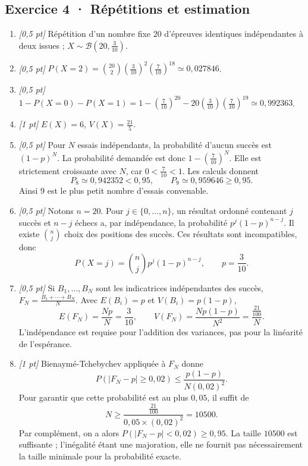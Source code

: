 \subsection*{Exercice 4 · Répétitions et estimation}\begin{enumerate}

\item \textit{[0,5 pt]} Répétition d'un nombre fixe $20$ d'épreuves identiques indépendantes à deux issues ; $X\sim\mathcal B(20,\frac{3}{10})$.

\item \textit{[0,5 pt]} $P(X=2)=\binom{20}2(\frac{3}{10})^2(\frac{7}{10})^{18}\simeq0{,}027846$.

\item \textit{[0,5 pt]} $1-P(X=0)-P(X=1)=1-(\frac{7}{10})^{20}-20(\frac{3}{10})(\frac{7}{10})^{19}\simeq0{,}992363$.

\item \textit{[1 pt]} $E(X)=6$, $V(X)=\frac{21}{5}$.

\item \textit{[0,5 pt]} Pour $N$ essais indépendants, la probabilité d'aucun succès est $(1-p)^N$. La probabilité demandée est donc $1-(\frac{7}{10})^N$. Elle est strictement croissante avec $N$, car $0<\frac{7}{10}<1$. Les calculs donnent
\[P_{8}\simeq0{,}942352<0{,}95,\qquad P_{9}\simeq0{,}959646\ge0{,}95.\]
Ainsi $9$ est le plus petit nombre d'essais convenable.

\item \textit{[0,5 pt]} Notons $n=20$. Pour $j\in\{0,\ldots,n\}$, un résultat ordonné contenant $j$ succès et $n-j$ échecs a, par indépendance, la probabilité $p^j(1-p)^{n-j}$. Il existe $\binom nj$ choix des positions des succès. Ces résultats sont incompatibles, donc
\[P(X=j)=\binom nj p^j(1-p)^{n-j},\qquad p=\frac{3}{10}.\]

\item \textit{[0,5 pt]} Si $B_1,\ldots,B_N$ sont les indicatrices indépendantes des succès, $F_N=\frac{B_1+\cdots+B_N}{N}$. Avec $E(B_i)=p$ et $V(B_i)=p(1-p)$,
\[E(F_N)=\frac{Np}{N}=\frac{3}{10},\qquad V(F_N)=\frac{Np(1-p)}{N^2}=\frac{\frac{21}{100}}{N}.\]
L'indépendance est requise pour l'addition des variances, pas pour la linéarité de l'espérance.

\item \textit{[1 pt]} Bienaymé-Tchebychev appliquée à $F_N$ donne
\[P(|F_N-p|\ge0{,}02)\le\frac{p(1-p)}{N(0{,}02)^2}.\]
Pour garantir que cette probabilité est au plus $0{,}05$, il suffit de
\[N\ge\frac{\frac{21}{100}}{0{,}05\times(0{,}02)^2}=10500.\]
Par complément, on a alors $P(|F_N-p|<0{,}02)\ge0{,}95$. La taille $10500$ est suffisante ; l'inégalité étant une majoration, elle ne fournit pas nécessairement la taille minimale pour la probabilité exacte.

\end{enumerate}

\fi

\fi

